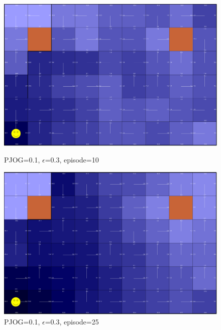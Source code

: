 \documentclass[11pt]{article}
\begin{document}
\begin{figure}[!htb]
   \begin{minipage}{0.4\textwidth}
     \centering
     \includegraphics[width=1.2\linewidth]{../figures/q1_3_10.png}
     \caption{PJOG=0.1, $\epsilon$=0.3, episode=10}\label{Fig:q1_3_10}
   \end{minipage}\hfill
   \begin{minipage}{0.4\textwidth}
     \centering
     \includegraphics[width=1.2\linewidth]{../figures/q1_3_25.png}
     \caption{PJOG=0.1, $\epsilon$=0.3, episode=25}\label{Fig:q1_3_25}
   \end{minipage}
\end{figure}
\end{document}
